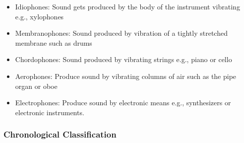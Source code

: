 \begin{itemize}
    \item Idiophones: Sound gets produced by the body of the instrument vibrating e.g., xylophones
    \item Membranophones: Sound produced by vibration of a tightly stretched membrane such as drums
    \item Chordophones: Sound produced by vibrating strings e.g., piano or cello
    \item Aerophones: Produce sound by vibrating columns of air such as the pipe organ or oboe
    \item Electrophones: Produce sound by electronic means e.g., synthesizers or electronic instruments.
\end{itemize}


\subsubsection{Chronological Classification}


